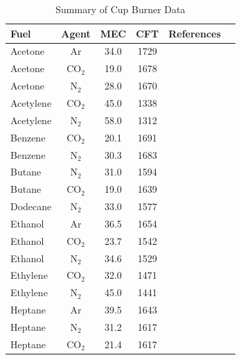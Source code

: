 \begin{table}[p]
\caption[Summary of Cup Burner Data]{Summary of Cup Burner Data}
\label{Cup_Table}
\small
\begin{tabular}{|l|c|c|c|c|l|}
\hline
Fuel       &  Agent  & MEC  & CFT  & References   \\ \hline \hline
Acetone    & Ar      & 34.0 & 1729 & \cite{Tapscott:1,Moore:1}  \\ \hline
Acetone    & CO$_2$  & 19.0 & 1678 & \cite{Yamamoto:1}  \\ \hline
Acetone    & N$_2$   & 28.0 & 1670 & \cite{Tapscott:1,Yamamoto:1}  \\ \hline
Acetylene  & CO$_2$  & 45.0 & 1338 & \cite{Yamamoto:1}  \\ \hline
Acetylene  & N$_2$   & 58.0 & 1312 & \cite{Yamamoto:1}  \\ \hline
Benzene    & CO$_2$  & 20.1 & 1691 & \cite{Yamamoto:1,Sakei:1}  \\ \hline
Benzene    & N$_2$   & 30.3 & 1683 & \cite{Tapscott:1,Yamamoto:1,Sakei:1}  \\ \hline
Butane     & N$_2$   & 31.0 & 1594 & \cite{Yamamoto:1}  \\ \hline
Butane     & CO$_2$  & 19.0 & 1639 & \cite{Yamamoto:1}  \\ \hline
Dodecane   & N$_2$   & 33.0 & 1577 & \cite{Tapscott:1}  \\ \hline
Ethanol    & Ar      & 36.5 & 1654 & \cite{Tapscott:1,Moore:1}  \\ \hline
Ethanol    & CO$_2$  & 23.7 & 1542 & \cite{Yamamoto:1,Sakei:1}  \\ \hline
Ethanol    & N$_2$   & 34.6 & 1529 & \cite{Tapscott:1,Yamamoto:1,Sakei:1}  \\ \hline
Ethylene   & CO$_2$  & 32.0 & 1471 & \cite{Yamamoto:1}  \\ \hline
Ethylene   & N$_2$   & 45.0 & 1441 & \cite{Yamamoto:1}  \\ \hline
Heptane    & Ar      & 39.5 & 1643 & \cite{Tapscott:1,Bogdan:1,Moore:1,Sheinson:FSJ,Grosshandler:Cup,Saito:FSJ,NFPA_2001,ISO_14520,Senecal:FSJ}  \\ \hline
Heptane    & N$_2$   & 31.2 & 1617 & \cite{Tapscott:1,Bogdan:1,Hamins:CS1998,Moore:1,Hirst:1,Sheinson:FSJ,Grosshandler:Cup,Saito:FSJ,Yamamoto:1,Sakei:1,NFPA_2001,ISO_14520,Senecal:FSJ}  \\ \hline
Heptane    & CO$_2$  & 21.4 & 1617 & \cite{Moore:1,Hirst:1,Sheinson:FSJ,Grosshandler:Cup,Saito:FSJ,Yamamoto:1,Sakei:1}  \\ \hline

\end{tabular}
\end{table}
